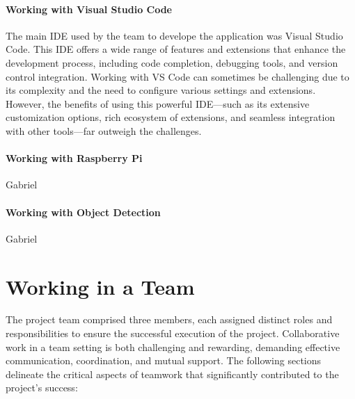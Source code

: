 \paragraph{Working with Visual Studio Code}

The main IDE used by the team to develope the application was Visual Studio Code. This IDE offers a wide range of features and extensions that enhance the development process, including code completion, debugging tools, and version control integration.
Working with VS Code can sometimes be challenging due to its complexity and the need to configure various settings and extensions. However, the benefits of using this powerful IDE—such as its extensive customization options, rich ecosystem of extensions, and seamless integration with other tools—far outweigh the challenges.

\paragraph{Working with Raspberry Pi}   

Gabriel

\paragraph{Working with Object Detection}

Gabriel

\section{Working in a Team}

The project team comprised three members, each assigned distinct roles and responsibilities to ensure the successful execution of the project. Collaborative work in a team setting is both challenging and rewarding, demanding effective communication, coordination, and mutual support. The following sections delineate the critical aspects of teamwork that significantly contributed to the project’s success:


